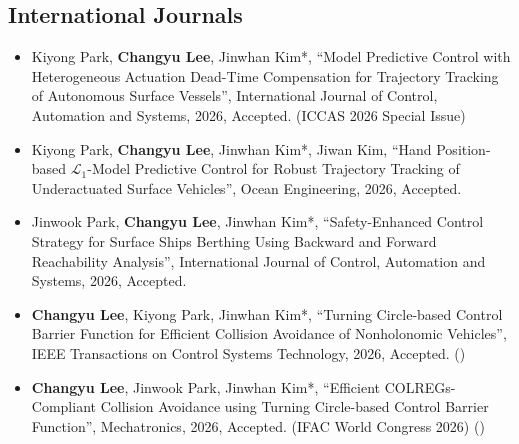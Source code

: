 \documentclass[10pt, letterpaper]{article}
\let\hrefWithoutArrow\href
\renewcommand{\href}[2]{\hrefWithoutArrow{#1}{\mbox{\ifthenelse{\equal{#2}{}}{ }{#2 }\raisebox{.15ex}{\footnotesize \faExternalLink*}}}}
\begin{document}
    \subsection{International Journals}
        \begin{itemize}
            \item [\textbf{[J14]}] Kiyong Park, \textbf{Changyu Lee}, Jinwhan Kim*, “Model Predictive Control with Heterogeneous Actuation Dead-Time Compensation for Trajectory Tracking of Autonomous Surface Vessels”, \textcolor{NavyBlue}{International Journal of Control, Automation and Systems}, 2026, Accepted. (ICCAS 2026 Special Issue)

            \vspace{0.2 cm}

            \item [\textbf{[J13]}] Kiyong Park, \textbf{Changyu Lee}, Jinwhan Kim*, Jiwan Kim, “Hand Position-based $\mathcal{L}_1$-Model Predictive Control for Robust Trajectory Tracking of Underactuated Surface Vehicles”, \textcolor{NavyBlue}{Ocean Engineering}, 2026, Accepted.

            \vspace{0.2 cm}

            \item [\textbf{[J12]}] Jinwook Park, \textbf{Changyu Lee}, Jinwhan Kim*, “Safety-Enhanced Control Strategy for Surface Ships Berthing Using Backward and Forward Reachability Analysis”, \textcolor{NavyBlue}{International Journal of Control, Automation and Systems}, 2026, Accepted.

            \vspace{0.2 cm}

            \item [\textbf{[J11]}] \textbf{Changyu Lee}, Kiyong Park, Jinwhan Kim*, “Turning Circle-based Control Barrier Function for Efficient Collision Avoidance of Nonholonomic Vehicles”, \textcolor{NavyBlue}{IEEE Transactions on Control Systems Technology}, 2026, Accepted. (\href{https://arxiv.org/abs/2503.20280}{arXiv})

            \vspace{0.2 cm}

            \item [\textbf{[J10]}] \textbf{Changyu Lee}, Jinwook Park, Jinwhan Kim*, “Efficient COLREGs-Compliant Collision Avoidance using Turning Circle-based Control Barrier Function”, \textcolor{NavyBlue}{Mechatronics}, 2026, Accepted. (IFAC World Congress 2026) (\href{https://arxiv.org/abs/2504.19247}{arXiv})


\end{itemize}
\end{document}
